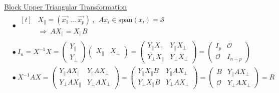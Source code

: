 \documentclass[12pt]{article}
\begin{document}
\underline{Block Upper Triangular Transformation}\\[10pt]
\(\begin{aligned}
	&\bullet\ \begin{aligned}[t]
			&X_\parallel = \left(\vec{x_1} \ \dots \ \vec{x_p}\right) 
				\ , \ \ Ax_i \in \text{span}(x_i) = \mathcal{S}\\[5pt]
			&\Rightarrow \ AX_\parallel = X_\parallel B
		\end{aligned}\\[5pt]
	&\bullet\ I_n = X^{-1} X = \left(\begin{matrix}
			Y_\parallel \\
			Y_\perp
		\end{matrix}\right) 
		\left(\begin{matrix}
			X_\parallel & X_\perp
		\end{matrix}\right)
		= 
		\left(\begin{matrix}
			Y_\parallel X_\parallel & Y_\parallel X_\perp\\
			Y_\perp X_\parallel & Y_\perp X_\perp
		\end{matrix}\right)
		= 
		\left(\begin{matrix}
			I_{p} & \mathcal{O}\\
			\mathcal{O} & I_{n-p}
		\end{matrix}\right)\\[10pt]
	&\bullet\ X^{-1}AX = \left(\begin{matrix}
			Y_\parallel A X_\parallel & Y_\parallel A X_\perp\\
			Y_\perp A X_\parallel & Y_\perp A X_\perp
		\end{matrix}\right)
		=
		\left(\begin{matrix}
			Y_\parallel X_\parallel B & Y_\parallel A X_\perp\\
			Y_\perp X_\parallel B & Y_\perp A X_\perp
		\end{matrix}\right)
		=
		\left(\begin{matrix}
			B & Y_\parallel A X_\perp\\
			\mathcal{O} & Y_\perp A X_\perp
		\end{matrix}\right)
		= R
\end{aligned}\)

\newpage
\end{document}
